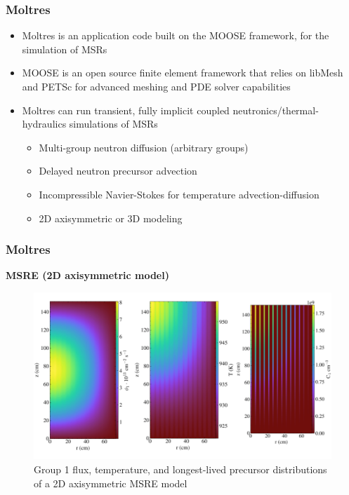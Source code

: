 \begin{frame}
	\frametitle{Moltres}
		\begin{itemize}
			\item Moltres is an application code built on the \gls{MOOSE}
			framework, for the simulation of \glspl{MSR}
			\item MOOSE is an open source finite element framework that
			relies on libMesh and PETSc for advanced meshing and PDE
			solver capabilities
			\item Moltres can run transient, fully implicit coupled
			neutronics/thermal-hydraulics simulations of \glspl{MSR}
			\begin{itemize}
				\item Multi-group neutron diffusion (arbitrary groups)
				\item Delayed neutron precursor advection
				\item Incompressible Navier-Stokes for temperature
				advection-diffusion
				\item 2D axisymmetric or 3D modeling
			\end{itemize}
		\end{itemize}
\end{frame}

\begin{frame}
	\frametitle{Moltres}
	\textbf{MSRE (2D axisymmetric model)}
	\begin{figure}
		\centering
		\includegraphics[width=.9\textwidth]{./images/msre}
		\caption{Group 1 flux, temperature, and longest-lived
		precursor distributions of a 2D axisymmetric MSRE model}
	\end{figure}
\end{frame}